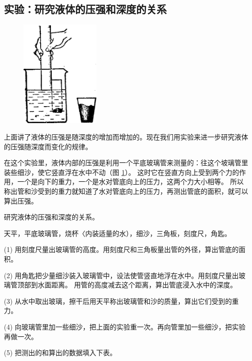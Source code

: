 \begin{starred}
\section{实验：研究液体的压强和深度的关系}\label{sec:5-6}
\end{starred}

\begin{figure}
    \centering
    \includegraphics[width=4cm]{../pic/czwl1-ch5-20}
    \caption{}\label{fig:5-20}
\end{figure}

上面讲了液体的压强是随深度的增加而增加的。现在我们用实验来进一步研究液体的压强随深度而变化的规律。

在这个实验里，液体内部的压强是利用一个平底玻璃管来测量的：往这个坡璃管里装些细沙，使它竖直浮在水中不动（图 \ref{fig:5-20}）。
这时它在竖直方向上受到两个力的作用，一个是向下的重力，一个是水对管底向上的压力，这两个力大小相等。
所以称出管和沙受到的重力就知道了水对管底向上的压力，再测出管底的面积，就可以算出压强。

 研究液体的压强和深度的关系。

 天平，平底玻璃管，烧杯〈内装适量的水），细沙，三角板，刻度尺，角匙。


(1) 用刻度尺量出玻璃管的高度。用刻度尺和三角板量出管的外径，算出管底的面积。

(2) 用角匙把少量细沙装入玻璃管中，设法使管竖直地浮在水中。用刻度尺量出玻璃管顶部到水面距离。
用管的高度减去这个距离，算出管底浸入水中的深度。

(3) 从水中取出玻璃，擦干后用天平称出玻璃管和沙的质量，算出它们受到的重力。

(4) 向玻璃管里加一些细沙，把上面的实验重一次。再向管里加一些细沙，把实验再做一次。

(5) 把测出的和算出的数据填入下表。

